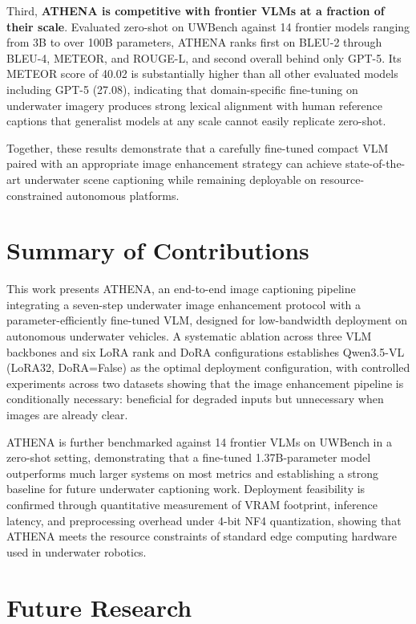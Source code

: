 Third, \textbf{ATHENA is competitive with frontier VLMs at a fraction of their scale}. Evaluated zero-shot on UWBench against 14 frontier models ranging from 3B to over 100B parameters, ATHENA ranks first on BLEU-2 through BLEU-4, METEOR, and ROUGE-L, and second overall behind only GPT-5. Its METEOR score of 40.02 is substantially higher than all other evaluated models including GPT-5 (27.08), indicating that domain-specific fine-tuning on underwater imagery produces strong lexical alignment with human reference captions that generalist models at any scale cannot easily replicate zero-shot.

Together, these results demonstrate that a carefully fine-tuned compact VLM paired with an appropriate image enhancement strategy can achieve state-of-the-art underwater scene captioning while remaining deployable on resource-constrained autonomous platforms.

\section{Summary of Contributions}

This work presents ATHENA, an end-to-end image captioning pipeline integrating a seven-step underwater image enhancement protocol with a parameter-efficiently fine-tuned VLM, designed for low-bandwidth deployment on autonomous underwater vehicles. A systematic ablation across three VLM backbones and six LoRA rank and DoRA configurations establishes Qwen3.5-VL (LoRA32, DoRA=False) as the optimal deployment configuration, with controlled experiments across two datasets showing that the image enhancement pipeline is conditionally necessary: beneficial for degraded inputs but unnecessary when images are already clear.

ATHENA is further benchmarked against 14 frontier VLMs on UWBench in a zero-shot setting, demonstrating that a fine-tuned 1.37B-parameter model outperforms much larger systems on most metrics and establishing a strong baseline for future underwater captioning work. Deployment feasibility is confirmed through quantitative measurement of VRAM footprint, inference latency, and preprocessing overhead under 4-bit NF4 quantization, showing that ATHENA meets the resource constraints of standard edge computing hardware used in underwater robotics.

\section{Future Research}

